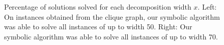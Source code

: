 

\begin{figure}[b]
    \begin{subfigure}{0.48\textwidth}
        \centering
         \resizebox{\textwidth}{!}{}
    \end{subfigure}
    \hfill
    \begin{subfigure}{0.48\textwidth}       
    \centering
    \resizebox{\textwidth}{!}{}
    \end{subfigure}
    \caption{ Percentage of solutions solved for each decomposition width $x$. Left: On instances obtained from the clique graph, our symbolic algorithm was  able to solve all instances of up to width 50. Right: Our symbolic algorithm was able to solve all instances of up to width 70.   \label{fig:comparisonPercentage}}
  
\end{figure}

